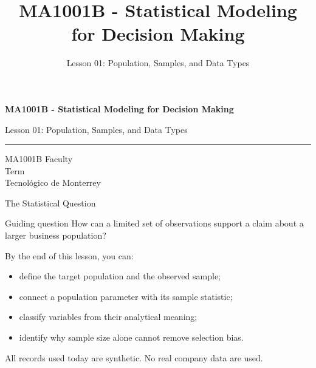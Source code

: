 \documentclass[aspectratio=169,10pt,english]{beamer}
\title{MA1001B - Statistical Modeling for Decision Making}
\subtitle{Lesson 01: Population, Samples, and Data Types}
\author{}
\institute{Tecnol\'ogico de Monterrey}
\date{}
\begin{document}
\begin{frame}[plain]
  \vspace{1.2cm}
  {\Large\bfseries MA1001B - Statistical Modeling for Decision Making\par}
  \vspace{0.7cm}
  {\large Lesson 01: Population, Samples, and Data Types\par}
  \vspace{0.7cm}
  {\color{TecRojo}\rule{\textwidth}{1.2pt}}
  \vspace{0.8cm}

  MA1001B Faculty\\[0.3cm]
  Term\\[0.3cm]
  Tecnol\'ogico de Monterrey
\end{frame}

\begin{frame}{The Statistical Question}
  \begin{alertblock}{Guiding question}
    How can a limited set of observations support a claim about a larger
    business population?
  \end{alertblock}

  \vspace{0.6em}
  By the end of this lesson, you can:
  \begin{itemize}
    \item define the target population and the observed sample;
    \item connect a population parameter with its sample statistic;
    \item classify variables from their analytical meaning;
    \item identify why sample size alone cannot remove selection bias.
  \end{itemize}

  \vfill
  \scriptsize All records used today are synthetic. No real company data are used.
\end{frame}
\end{document}
